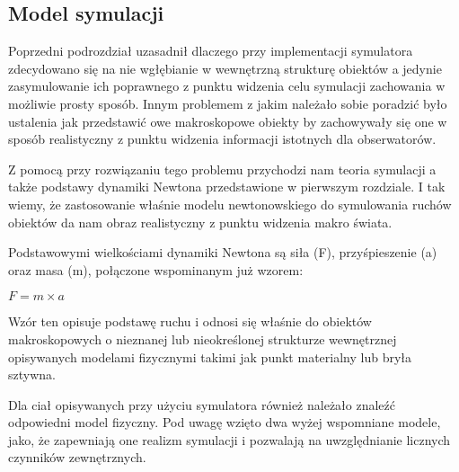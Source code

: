 \subsection{Model symulacji}
\par{
Poprzedni podrozdział uzasadnił dlaczego przy implementacji symulatora zdecydowano się na nie wgłębianie w wewnętrzną strukturę obiektów a jedynie zasymulowanie ich poprawnego z punktu widzenia celu symulacji zachowania w możliwie prosty sposób. Innym problemem z jakim należało sobie poradzić było ustalenia jak przedstawić owe makroskopowe obiekty by zachowywały się one w sposób realistyczny z punktu widzenia informacji istotnych dla obserwatorów.
}
\par{
Z pomocą przy rozwiązaniu tego problemu przychodzi nam teoria symulacji a także podstawy dynamiki Newtona przedstawione w pierwszym rozdziale.
I tak wiemy, że zastosowanie właśnie modelu newtonowskiego do symulowania ruchów obiektów da nam obraz realistyczny z punktu widzenia makro świata.
}
\par{
Podstawowymi wielkościami dynamiki Newtona są siła (F), przyśpieszenie (a) oraz masa (m), połączone wspominanym już wzorem:
\begin{center}
$F = m \times a$
\end{center}
Wzór ten opisuje podstawę ruchu i odnosi się właśnie do obiektów makroskopowych o nieznanej lub nieokreślonej strukturze wewnętrznej opisywanych modelami fizycznymi takimi jak punkt materialny lub bryła sztywna.
}
\par{
Dla ciał opisywanych przy użyciu symulatora również należało znaleźć odpowiedni model fizyczny. Pod uwagę wzięto dwa wyżej wspomniane modele, jako, że zapewniają one realizm symulacji i pozwalają na uwzględnianie licznych czynników zewnętrznych.
}
